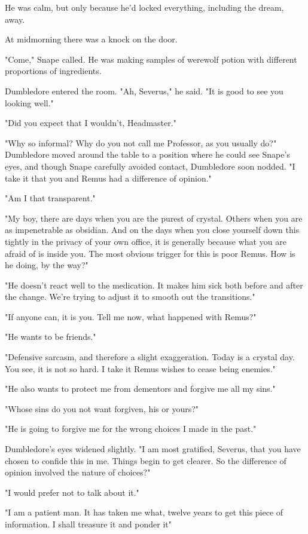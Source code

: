 He was calm, but only because he'd locked everything, including the dream, away.

At midmorning there was a knock on the door.

"Come," Snape called. He was making samples of werewolf potion with different proportions of ingredients.

Dumbledore entered the room. "Ah, Severus," he said. "It is good to see you looking well."

"Did you expect that I wouldn't, Headmaster."

"Why so informal? Why do you not call me Professor, as you usually do?" Dumbledore moved around the table to a position where he could see Snape's eyes, and though Snape carefully avoided contact, Dumbledore soon nodded. "I take it that you and Remus had a{\el} difference of opinion."

"Am I that transparent."

"My boy, there are days when you are the purest of crystal. Others when you are as impenetrable as obsidian. And on the days when you close yourself down this tightly in the privacy of your own office, it is generally because what you are afraid of is inside you. The most obvious trigger for this is poor Remus. How is he doing, by the way?"

"He doesn't react well to the medication. It makes him sick both before and after the change. We're trying to adjust it to smooth out the transitions."

"If anyone can, it is you. Tell me now, what happened with Remus?"

"He wants to be friends."

"Defensive sarcasm, and therefore a slight exaggeration. Today is a crystal day. You see, it is not so hard. I take it Remus wishes to cease being enemies."

"He also wants to protect me from dementors and forgive me all my sins."

"Whose sins do you not want forgiven, his or yours?"

"He is going to forgive me for the wrong choices I made in the past."

Dumbledore's eyes widened slightly. "I am most gratified, Severus, that you have chosen to confide this in me. Things begin to get clearer. So the difference of opinion involved the nature of choices?"

"I would prefer not to talk about it."

"I am a patient man. It has taken me what, twelve years to get this piece of information. I shall treasure it and ponder it{\el}"

